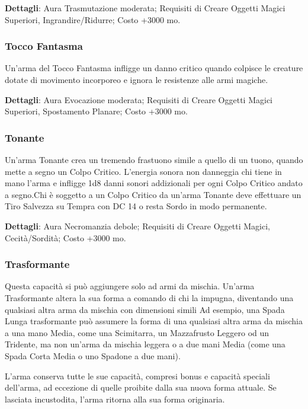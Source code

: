 \begin{multicols}{2}
\textbf{Dettagli}: Aura Trasmutazione moderata; Requisiti di Creare Oggetti Magici Superiori, Ingrandire/Ridurre; Costo +3000 mo.

\subsubsection*{Tocco Fantasma}

Un'arma del Tocco Fantasma infligge un danno critico quando colpisce le creature dotate di movimento incorporeo e ignora le resistenze alle armi magiche.

\textbf{Dettagli}: Aura Evocazione moderata; Requisiti di Creare Oggetti Magici Superiori, Spostamento Planare; Costo +3000 mo.

\subsubsection*{Tonante}

Un'arma Tonante crea un tremendo frastuono simile a quello di un tuono, quando mette a segno un Colpo Critico. L'energia sonora non danneggia chi tiene in mano l'arma e infligge 1d8 danni sonori addizionali per ogni Colpo Critico andato a segno.Chi è soggetto a un Colpo Critico da un'arma Tonante deve effettuare un Tiro Salvezza su Tempra con DC 14 o resta Sordo in modo permanente.

\textbf{Dettagli}: Aura Necromanzia debole; Requisiti di Creare Oggetti Magici, Cecità/Sordità; Costo +3000 mo.

\subsubsection*{Trasformante}

Questa capacità si può aggiungere solo ad armi da mischia. Un'arma Trasformante altera la sua forma a comando di chi la impugna, diventando una qualsiasi altra arma da mischia con dimensioni simili Ad esempio, una Spada Lunga trasformante può assumere la forma di una qualsiasi altra arma da mischia a una mano Media, come una Scimitarra, un Mazzafrusto Leggero od un Tridente, ma non un'arma da mischia leggera o a due mani Media (come una Spada Corta Media o uno Spadone a due mani).

L'arma conserva tutte le sue capacità, compresi bonus e capacità speciali dell'arma, ad eccezione di quelle proibite dalla sua nuova forma attuale. Se lasciata incustodita, l'arma ritorna alla sua forma originaria.


\end{multicols}
